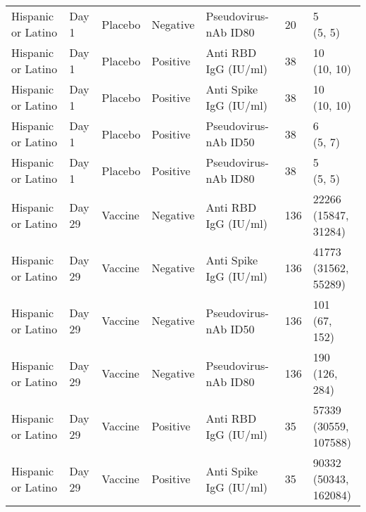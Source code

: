 \documentclass[]{book}
\theoremstyle{definition}
\theoremstyle{definition}
\theoremstyle{definition}
\newcommand{\1}{\mathbbm{1}}
\begin{document}
\begin{landscape}
\begin{ThreePartTable}
\begin{longtable}[t]{>{\raggedright\arraybackslash}p{7cm}llllll}
\hspace{1em}Hispanic or Latino & Day 1 & Placebo & Negative & Pseudovirus-nAb ID80 & 20 & \makecell[l]{5\\(5, 5)}\\
\hspace{1em}Hispanic or Latino & Day 1 & Placebo & Positive & Anti RBD IgG (IU/ml) & 38 & \makecell[l]{10\\(10, 10)}\\
\hspace{1em}Hispanic or Latino & Day 1 & Placebo & Positive & Anti Spike IgG (IU/ml) & 38 & \makecell[l]{10\\(10, 10)}\\
\hspace{1em}Hispanic or Latino & Day 1 & Placebo & Positive & Pseudovirus-nAb ID50 & 38 & \makecell[l]{6\\(5, 7)}\\
\hspace{1em}Hispanic or Latino & Day 1 & Placebo & Positive & Pseudovirus-nAb ID80 & 38 & \makecell[l]{5\\(5, 5)}\\
\hspace{1em}Hispanic or Latino & Day 29 & Vaccine & Negative & Anti RBD IgG (IU/ml) & 136 & \makecell[l]{22266\\(15847, 31284)}\\
\hspace{1em}Hispanic or Latino & Day 29 & Vaccine & Negative & Anti Spike IgG (IU/ml) & 136 & \makecell[l]{41773\\(31562, 55289)}\\
\hspace{1em}Hispanic or Latino & Day 29 & Vaccine & Negative & Pseudovirus-nAb ID50 & 136 & \makecell[l]{101\\(67, 152)}\\
\hspace{1em}Hispanic or Latino & Day 29 & Vaccine & Negative & Pseudovirus-nAb ID80 & 136 & \makecell[l]{190\\(126, 284)}\\
\hspace{1em}Hispanic or Latino & Day 29 & Vaccine & Positive & Anti RBD IgG (IU/ml) & 35 & \makecell[l]{57339\\(30559, 107588)}\\
\hspace{1em}Hispanic or Latino & Day 29 & Vaccine & Positive & Anti Spike IgG (IU/ml) & 35 & \makecell[l]{90332\\(50343, 162084)}\\

\end{longtable}
\end{ThreePartTable}
\end{landscape}
\end{document}
